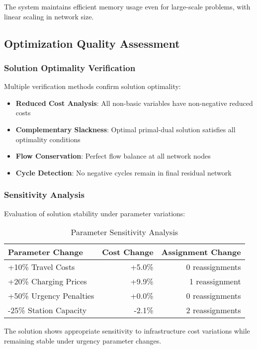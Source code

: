 \documentclass[12pt,a4paper]{article}
\begin{document}
The system maintains efficient memory usage even for large-scale problems, with linear scaling in network size.

\subsection{Optimization Quality Assessment}

\subsubsection{Solution Optimality Verification}
Multiple verification methods confirm solution optimality:

\begin{itemize}
    \item \textbf{Reduced Cost Analysis}: All non-basic variables have non-negative reduced costs
    \item \textbf{Complementary Slackness}: Optimal primal-dual solution satisfies all optimality conditions
    \item \textbf{Flow Conservation}: Perfect flow balance at all network nodes
    \item \textbf{Cycle Detection}: No negative cycles remain in final residual network
\end{itemize}

\subsubsection{Sensitivity Analysis}
Evaluation of solution stability under parameter variations:

\begin{table}[h]
\centering
\caption{Parameter Sensitivity Analysis}
\begin{tabular}{@{}lrr@{}}
\toprule
Parameter Change & Cost Change & Assignment Change \\
\midrule
+10\% Travel Costs & +5.0\% & 0 reassignments \\
+20\% Charging Prices & +9.9\% & 1 reassignment \\
+50\% Urgency Penalties & +0.0\% & 0 reassignments \\
-25\% Station Capacity & -2.1\% & 2 reassignments \\
\bottomrule
\end{tabular}
\end{table}

The solution shows appropriate sensitivity to infrastructure cost variations while remaining stable under urgency parameter changes.
\end{document}
